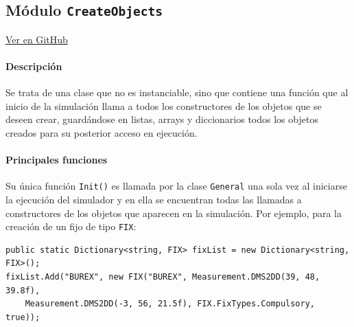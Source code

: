 \subsection{Módulo \texttt{CreateObjects}}
\label{subsec:ClaseCreateObjects}

\vspace{-0.85cm}
\begin{flushright}
\href{https://github.com/macgyver912/atc-simulator/blob/jaime/Assets/Scripts/game/CreateObjects.cs}{Ver en GitHub \faGithub}
\end{flushright}

\paragraph{Descripción} \phantom{\newline}

Se trata de una clase que no es instanciable, sino que contiene una función que al inicio de la simulación llama a todos los constructores de los objetos que se deseen crear, guardándose en listas, arrays y diccionarios todos los objetos creados para su posterior acceso en ejecución.

\paragraph{Principales funciones} \phantom{\newline}

Su única función \texttt{Init()} es llamada por la clase \texttt{General} una sola vez al iniciarse la ejecución del simulador y en ella se encuentran todas las llamadas a constructores de los objetos que aparecen en la simulación. Por ejemplo, para la creación de un fijo de tipo \texttt{FIX}:

\begin{scriptsize}
\begin{Verbatim}[frame=single]
public static Dictionary<string, FIX> fixList = new Dictionary<string, FIX>();
fixList.Add("BUREX", new FIX("BUREX", Measurement.DMS2DD(39, 48, 39.8f), 
    Measurement.DMS2DD(-3, 56, 21.5f), FIX.FixTypes.Compulsory, true));
\end{Verbatim}
\end{scriptsize}





